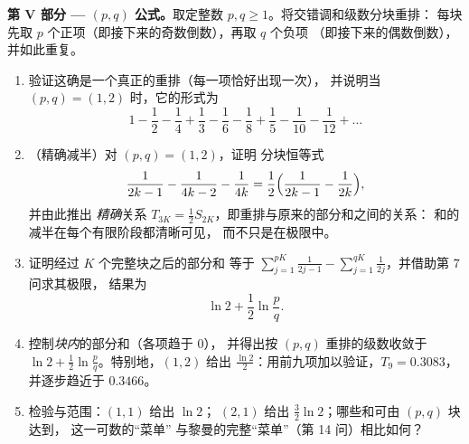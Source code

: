 \begin{problem}[{周末问题 --- $H_n = \ln n + \gamma +
\frac{1}{2n} + O(n^{-2})$，并将 $1 - \frac12 +
\frac13 - \dots$ 重排为 $\frac{\ln 2}{2}$}]
\medskip
\noindent\textbf{第 V 部分 --- $(p, q)$ 公式。}取定整数
$p, q \geq 1$。将交错调和级数分块重排：
每块先取 $p$ 个正项（即接下来的奇数倒数），再取 $q$ 个负项
（即接下来的偶数倒数），并如此重复。
\begin{enumerate}[resume]
  \item 验证这确是一个真正的重排（每一项恰好出现一次），
        并说明当 $(p, q) = (1, 2)$ 时，它的形式为
        \[
        1 - \frac12 - \frac14 + \frac13 - \frac16 - \frac18 +
        \frac15 - \frac1{10} - \frac1{12} + \dots
        \]
  \item （精确减半）对 $(p, q) = (1, 2)$，证明
        分块恒等式
        \[
        \frac{1}{2k-1} - \frac{1}{4k-2} - \frac{1}{4k}
        = \frac12\Bigl(\frac{1}{2k-1} - \frac{1}{2k}\Bigr),
        \]
        并由此推出 \emph{精确}关系 $T_{3K} = \frac12
        S_{2K}$，即重排与原来的部分和之间的关系：
        和的减半在每个有限阶段都清晰可见，
        而不只是在极限中。
  \item 证明经过 $K$ 个完整块之后的部分和
        等于 $\sum_{j=1}^{pK} \frac{1}{2j-1} -
        \sum_{j=1}^{qK} \frac{1}{2j}$，并借助第 7 问求其极限，
        结果为
        \[
        \ln 2 + \frac12 \ln\frac pq .
        \]
  \item 控制\emph{块内}的部分和（各项趋于 $0$），
        并得出按 $(p,
        q)$ 重排的级数收敛于 $\ln 2 + \frac12\ln
        \frac pq$。特别地，$(1, 2)$ 给出 $\frac{\ln
        2}{2}$：用前九项加以验证，$T_9 =
        0.3083$，并逐步趋近于 $0.3466$。
  \item 检验与范围：$(1,1)$ 给出 $\ln 2$；
        $(2,1)$ 给出 $\frac32\ln 2$；哪些和可由 $(p, q)$ 块达到，
        这一可数的“菜单”
        与黎曼的完整“菜单”（第 14 问）相比如何？
\end{enumerate}


\end{problem}
